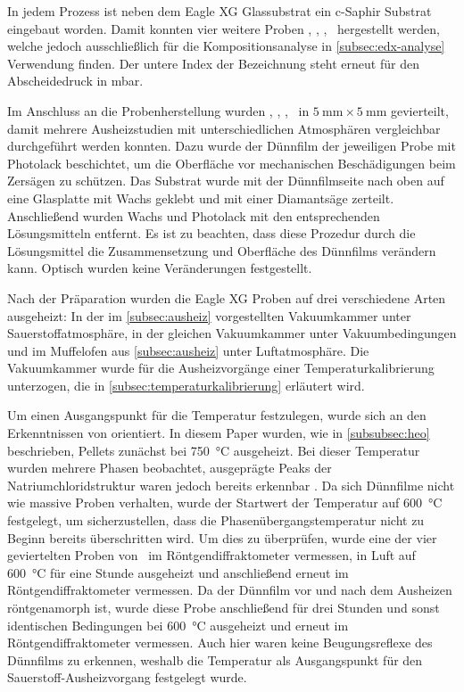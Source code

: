 In jedem Prozess ist neben dem Eagle XG Glassubstrat ein c-Saphir Substrat eingebaut worden.
Damit konnten vier weitere Proben \csamplethree, \csampleone, \csampletwo, \csamplefour\ hergestellt werden, welche
jedoch ausschließlich für die Kompositionsanalyse in \cref{subsec:edx-analyse} Verwendung finden.
Der untere Index der Bezeichnung steht erneut für den Abscheidedruck in \unit{\milli \bar}.

Im Anschluss an die Probenherstellung wurden \samplethree, \sampleone, \sampletwo, \samplefour\ in
$\qty{5}{\milli\meter}\times \qty{5}{\milli\meter}$ gevierteilt, damit mehrere Ausheizstudien mit unterschiedlichen
Atmosphären vergleichbar durchgeführt werden konnten.
Dazu wurde der Dünnfilm der jeweiligen Probe mit Photolack beschichtet, um die Oberfläche vor
mechanischen Beschädigungen beim Zersägen zu schützen.
Das Substrat wurde mit der Dünnfilmseite nach oben auf eine Glasplatte mit Wachs geklebt und mit einer
Diamantsäge zerteilt.
Anschließend wurden Wachs und Photolack mit den entsprechenden Lösungsmitteln entfernt.
Es ist zu beachten, dass diese Prozedur durch die Lösungsmittel die Zusammensetzung und Oberfläche des Dünnfilms
verändern kann.
Optisch wurden keine Veränderungen festgestellt.

Nach der Präparation wurden die Eagle XG Proben auf drei verschiedene Arten ausgeheizt:
In der im \cref{subsec:ausheiz} vorgestellten Vakuumkammer unter Sauerstoffatmosphäre, in der gleichen Vakuumkammer
unter Vakuumbedingungen und im Muffelofen aus \cref{subsec:ausheiz} unter Luftatmosphäre.
Die Vakuumkammer wurde für die Ausheizvorgänge einer Temperaturkalibrierung unterzogen, die in
\cref{subsec:temperaturkalibrierung} erläutert wird.

Um einen Ausgangspunkt für die Temperatur festzulegen, wurde sich an den Erkenntnissen von 
orientiert.
In diesem Paper wurden, wie in \cref{subsubsec:heo} beschrieben, Pellets zunächst bei \qty{750}{\degreeCelsius}
ausgeheizt.
Bei dieser Temperatur wurden mehrere Phasen beobachtet, ausgeprägte Peaks der Natriumchloridstruktur waren jedoch
bereits erkennbar \autocite{Rost2015}.
Da sich Dünnfilme nicht wie massive Proben verhalten, wurde der Startwert der Temperatur auf \qty{600}{\degreeCelsius}
festgelegt, um sicherzustellen, dass die Phasenübergangstemperatur nicht zu Beginn bereits überschritten wird.
Um dies zu überprüfen, wurde eine der vier geviertelten Proben von \sampletwo\, im Röntgendiffraktometer vermessen,
in Luft auf \qty{600}{\degreeCelsius} für eine Stunde ausgeheizt und anschließend erneut im Röntgendiffraktometer vermessen.
Da der Dünnfilm vor und nach dem Ausheizen röntgenamorph ist, wurde diese Probe anschließend für drei Stunden und sonst
identischen Bedingungen bei \qty{600}{\degreeCelsius} ausgeheizt und erneut im Röntgendiffraktometer vermessen.
Auch hier waren keine Beugungsreflexe des Dünnfilms zu erkennen, weshalb die Temperatur als Ausgangspunkt für den
Sauerstoff-Aus\-heiz\-vor\-gang festgelegt wurde.

